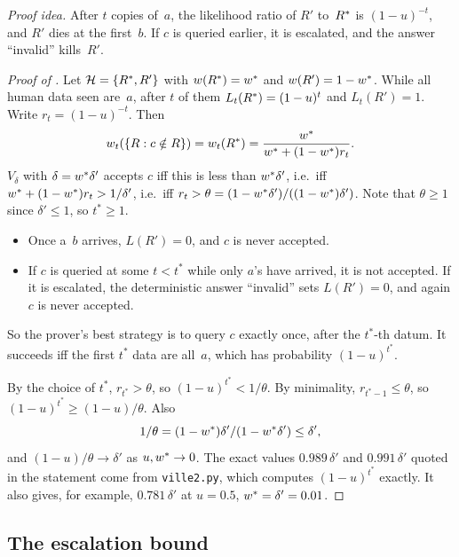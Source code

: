 \noindent\emph{Proof idea.} After $t$ copies of~$a$, the likelihood ratio of $R'$ to~$R^{*}$ is $(1-u)^{-t}$, and $R'$ dies at the first~$b$. If $c$ is queried earlier, it is escalated, and the answer ``invalid'' kills~$R'$.

\begin{proof}[Proof of ]
Let $\mathcal{H}=\{R^{*},R'\}$ with $w(R^{*})=w^{*}$ and $w(R')=1-w^{*}$. While all human data seen are~$a$, after $t$ of them $L_t(R^{*})=(1-u)^t$ and $L_t(R')=1$. Write $r_t=(1-u)^{-t}$. Then
\[
w_t(\{R:c\notin R\})=w_t(R^{*})=\frac{w^{*}}{w^{*}+(1-w^{*})r_t}.
\]
$V_\delta$ with $\delta=w^{*}\delta'$ accepts $c$ iff this is less than $w^{*}\delta'$, i.e.\ iff $w^{*}+(1-w^{*})r_t>1/\delta'$, i.e.\ iff $r_t>\theta=(1-w^{*}\delta')/((1-w^{*})\delta')$. Note that $\theta\ge1$ since $\delta'\le1$, so $t^*\ge1$.
\begin{itemize}
\item Once a~$b$ arrives, $L(R')=0$, and $c$ is never accepted.
\item If $c$ is queried at some $t<t^*$ while only $a$'s have arrived, it is not accepted. If it is escalated, the deterministic answer ``invalid'' sets $L(R')=0$, and again $c$ is never accepted.
\end{itemize}
So the prover's best strategy is to query $c$ exactly once, after the $t^*$-th datum. It succeeds iff the first $t^*$ data are all~$a$, which has probability $(1-u)^{t^*}$.

By the choice of $t^*$, $r_{t^*}>\theta$, so $(1-u)^{t^*}<1/\theta$. By minimality, $r_{t^*-1}\le\theta$, so $(1-u)^{t^*}\ge(1-u)/\theta$. Also
\[
1/\theta=(1-w^{*})\delta'/(1-w^{*}\delta')\le\delta',
\]
and $(1-u)/\theta\to\delta'$ as $u,w^{*}\to0$. The exact values $0.989\,\delta'$ and $0.991\,\delta'$ quoted in the statement come from \texttt{ville2.py}, which computes $(1-u)^{t^*}$ exactly. It also gives, for example, $0.781\,\delta'$ at $u=0.5$, $w^{*}=\delta'=0.01$.
\end{proof}

\subsection{The escalation bound}\label{app:caution:bayesesc}

